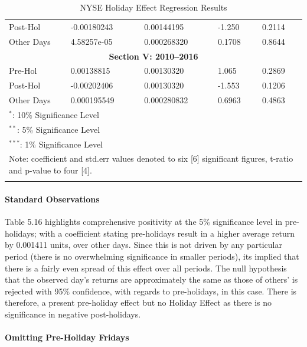 \documentclass[11pt, english]{article}
\begin{document}
\begin{center}
\begin{longtable}{p{2cm}p{2cm}p{2cm}p{2cm}p{2cm}}
                Post-Hol & -0.00180243 & 0.00144195 & -1.250 & 0.2114\\  
                Other Days & 4.58257e-05 & 0.000268320 & 0.1708 & 0.8644\\
                \hline 
                \multicolumn{5}{c}{\textbf{Section V: 2010--2016}}\\   
                \hline            
                Pre-Hol & 0.00138815 & 0.00130320 & 1.065 & 0.2869\\ 
                Post-Hol & -0.00202406 & 0.00130320 & -1.553 & 0.1206\\  
                Other Days & 0.000195549 & 0.000280832 & 0.6963 & 0.4863\\
		\hline
		\multicolumn{5}{l}{$^*$: 10\% Significance Level}\\  
                \multicolumn{5}{l}{$^{**}$: 5\% Significance Level}\\ 
                \multicolumn{5}{l}{$^{***}$: 1\% Significance Level}\\
		\hline
		\multicolumn{5}{p{11.5cm}}{Note: coefficient and std.err values denoted to six [6] significant figures, t-ratio and p-value to four [4].}\\
                \hline
		\caption{NYSE Holiday Effect Regression Results}
	\end{longtable}
	\end{center}

			\paragraph{Standard Observations}

			Table 5.16 highlights comprehensive positivity at the 5\% significance level in pre- holidays; with a coefficient stating pre-holidays result in a higher average return by 0.001411 units, over other days. Since this is not driven by any particular period (there is no overwhelming significance in smaller periods), its implied that there is a fairly even spread of this effect over all periods. The null hypothesis that the observed day’s returns are approximately the same as those of others' is rejected with 95\% confidence, with regards to pre-holidays, in this case. There is therefore, a present pre-holiday effect but no Holiday Effect as there is no significance in negative post-holidays.

			\paragraph{Omitting Pre-Holiday Fridays}
\end{document}

